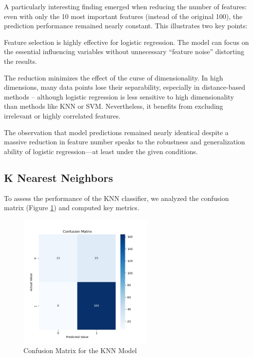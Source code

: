 \documentclass{article}
\begin{document}
A particularly interesting finding emerged when reducing the number of features: even with only the 10 most important features (instead of the original 100), the prediction performance remained nearly constant. This illustrates two key points:

Feature selection is highly effective for logistic regression. The model can focus on the essential influencing variables without unnecessary “feature noise” distorting the results.

The reduction minimizes the effect of the curse of dimensionality. In high dimensions, many data points lose their separability, especially in distance-based methods – although logistic regression is less sensitive to high dimensionality than methods like KNN or SVM. Nevertheless, it benefits from excluding irrelevant or highly correlated features.

The observation that model predictions remained nearly identical despite a massive reduction in feature number speaks to the robustness and generalization ability of logistic regression—at least under the given conditions.

\citep{hosmer2013logistic}

\subsection{K Nearest Neighbors}

To assess the performance of the KNN classifier, we analyzed the confusion matrix (Figure \ref{fig:confusion_matrix_KNN}) and computed key metrics.

\begin{figure}[h]
  \centering
  \includegraphics[width=0.6\textwidth]{confusion_matrix_KNN.png}
  \caption{Confusion Matrix for the KNN Model}
  \label{fig:confusion_matrix_KNN}
\end{figure}
\end{document}
